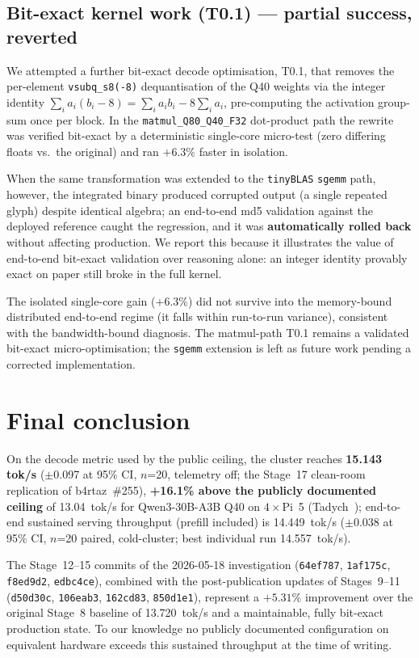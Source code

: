\documentclass[10pt,a4paper]{article}
\begin{document}
\subsection{Bit-exact kernel work (T0.1) --- partial success, reverted}
We attempted a further bit-exact decode optimisation, T0.1, that removes the per-element \texttt{vsubq\_s8(-8)} dequantisation of the Q40 weights via the integer identity $\sum_i a_i(b_i-8)=\sum_i a_i b_i - 8\sum_i a_i$, pre-computing the activation group-sum once per block. In the \texttt{matmul\_Q80\_Q40\_F32} dot-product path the rewrite was verified bit-exact by a deterministic single-core micro-test (zero differing floats vs.\ the original) and ran $+6.3\%$ faster in isolation.

When the same transformation was extended to the \texttt{tinyBLAS} \texttt{sgemm} path, however, the integrated binary produced corrupted output (a single repeated glyph) despite identical algebra; an end-to-end md5 validation against the deployed reference caught the regression, and it was \textbf{automatically rolled back} without affecting production. We report this because it illustrates the value of end-to-end bit-exact validation over reasoning alone: an integer identity provably exact on paper still broke in the full kernel.

The isolated single-core gain ($+6.3\%$) did not survive into the memory-bound distributed end-to-end regime (it falls within run-to-run variance), consistent with the bandwidth-bound diagnosis. The matmul-path T0.1 remains a validated bit-exact micro-optimisation; the \texttt{sgemm} extension is left as future work pending a corrected implementation.

\section{Final conclusion}

\label{sec:final-conclusion}

On the decode metric used by the public ceiling, the cluster reaches \textbf{15.143 tok/s} ($\pm$0.097 at 95\% CI, $n$=20, telemetry off; the Stage~17 clean-room replication of b4rtaz~\#255), \textbf{+16.1\% above the publicly documented ceiling} of 13.04~tok/s for Qwen3-30B-A3B Q40 on $4\times$Pi~5 (Tadych~\cite{dllama_discussion255}); end-to-end sustained serving throughput (prefill included) is 14.449~tok/s ($\pm$0.038 at 95\% CI, $n$=20 paired, cold-cluster; best individual run 14.557~tok/s).

The Stage~12--15 commits of the 2026-05-18 investigation (\texttt{64ef787}, \texttt{1af175c}, \texttt{f8ed9d2}, \texttt{edbc4ce}), combined with the post-publication updates of Stages~9--11 (\texttt{d50d30c}, \texttt{106eab3}, \texttt{162cd83}, \texttt{850d1e1}), represent a $+5.31\%$ improvement over the original Stage~8 baseline of 13.720~tok/s and a maintainable, fully bit-exact production state. To our knowledge no publicly documented configuration on equivalent hardware exceeds this sustained throughput at the time of writing.
\end{document}
